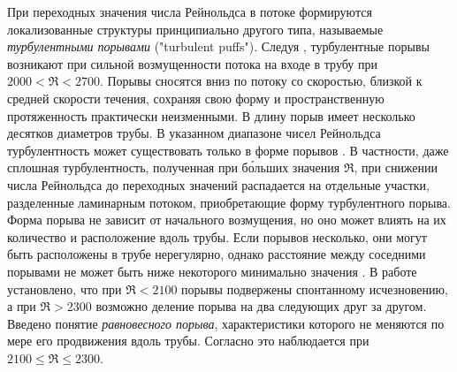 При переходных значения числа Рейнольдса в потоке формируются локализованные структуры принципиально другого типа, называемые {\it турбулентными порывами} ("turbulent puffs"). Следуя \cite{Wygnanski1973}, турбулентные порывы возникают при сильной возмущенности потока на входе в трубу при $2000<\Re<2700$. Порывы сносятся вниз по потоку со скоростью, близкой к средней скорости течения, сохраняя свою форму и пространственную протяженность практически неизменными. В длину порыв имеет несколько десятков диаметров трубы. В указанном диапазоне чисел Рейнольдса турбулентность может существовать только в форме порывов \cite{vanDoorne2009, Moxey2010, Samanta2011}. В частности, даже сплошная турбулентность, полученная при б\'{о}льших значения $\Re$, при снижении числа Рейнольдса до переходных значений распадается на отдельные участки, разделенные ламинарным потоком, приобретающие форму турбулентного порыва. Форма порыва не зависит от начального возмущения, но оно может влиять на их количество и расположение вдоль трубы. Если порывов несколько, они могут быть расположены в трубе нерегулярно, однако расстояние между соседними порывами не может быть ниже некоторого минимально значения \cite{Samanta2011}. В работе \cite{Wygnanski1975} установлено, что при $\Re<2100$ порывы подвержены спонтанному исчезновению, а при $\Re>2300$ возможно деление порыва на два следующих друг за другом. Введено понятие {\it равновесного порыва}, характеристики которого не меняются по мере его продвижения вдоль трубы. Согласно \cite{Wygnanski1975} это наблюдается при $2100\leqslant \Re \leqslant 2300$. 

